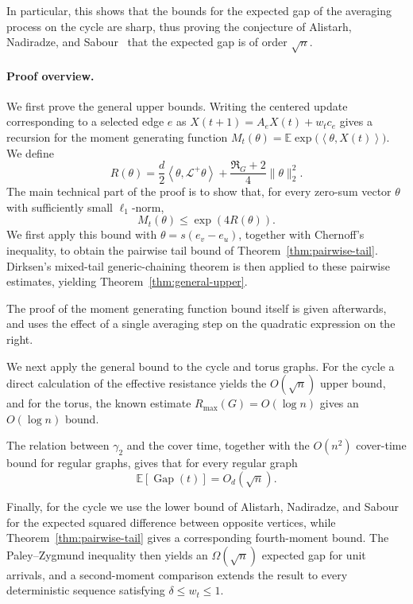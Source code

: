 \documentclass[11pt]{article}
\numberwithin{equation}{section}
\newcommand{\E}{\mathbb{E}}
\newcommand{\1}{\mathbf{1}}
\newcommand{\ip}[2]{\left\langle #1,#2\right\rangle}
\newcommand{\Gap}{\operatorname{Gap}}
\begin{document}
In particular, this shows that the bounds for the expected gap of the averaging process on the cycle are sharp, thus proving the conjecture of Alistarh, Nadiradze, and Sabour~\cite{AlistarhNadiradzeSabour} that the expected gap is of order \(\sqrt n\).

\paragraph{Proof overview.}
We first prove the general upper bounds. Writing the centered update corresponding to a selected edge \(e\) as \( X(t+1)=A_eX(t)+w_tc_e \) gives a recursion for the moment generating function
\( M_t(\theta)=\E\exp\bigl(\ip{\theta}{X(t)}\bigr).\)
We define 
\[
R(\theta)=\frac d2\ip{\theta}{\mathcal L^+\theta}+\frac{\Re_G+2}{4}\|\theta\|_2^2.
\]
The main technical part of the proof is to show that, for every zero-sum vector \(\theta\) with sufficiently small \(\ell_1\)-norm,
\[
M_t(\theta)
\le
\exp\left(
4R(\theta)
\right).
\]
We first apply this bound with \(\theta=s(e_v-e_u)\), together with Chernoff's inequality, to obtain the pairwise tail bound of Theorem~\ref{thm:pairwise-tail}. Dirksen's mixed-tail generic-chaining theorem is then applied to these pairwise estimates, yielding Theorem~\ref{thm:general-upper}.

The proof of the moment generating function bound itself is given afterwards, and uses the effect of a single averaging step on the quadratic expression on the right.

\medskip

We next apply the general bound to the cycle and torus graphs. For the cycle a direct calculation of the effective resistance yields the \(O(\sqrt n)\) upper bound, and for the torus, the known estimate \(R_{\max}(G)=O(\log n)\) gives an \(O(\log n)\) bound. 

\medskip

The relation between \(\gamma_2\) and the cover time, together with the \(O(n^2)\) cover-time bound for regular graphs, gives that for every regular graph
\[
\E[\Gap(t)]=O_d(\sqrt n).
\]

Finally, for the cycle we use the lower bound of Alistarh, Nadiradze, and Sabour for the expected squared difference between opposite vertices, while Theorem~\ref{thm:pairwise-tail} gives a corresponding fourth-moment bound. The Paley--Zygmund inequality then yields an \(\Omega(\sqrt n)\) expected gap for unit arrivals, and a second-moment comparison extends the result to every deterministic sequence satisfying \(\delta\le w_t\le1\).
\end{document}
